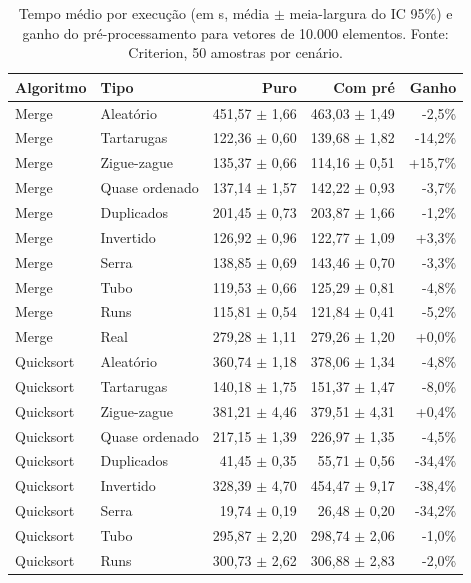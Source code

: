 \begin{table}[ht]
\centering
\caption{Tempo médio por execução (em \textmu{}s, média $\pm$ meia-largura do IC 95\%) e ganho do pré-processamento para vetores de 10.000 elementos. Fonte: Criterion, 50 amostras por cenário.}
\label{tab:tempos}
\small
\begin{tabular}{llrrr}
\hline
\textbf{Algoritmo} & \textbf{Tipo} & \textbf{Puro} & \textbf{Com pré} & \textbf{Ganho} \\
\hline
Merge & Aleatório & 451,57 $\pm$ 1,66 & 463,03 $\pm$ 1,49 & -2,5\% \\
Merge & Tartarugas & 122,36 $\pm$ 0,60 & 139,68 $\pm$ 1,82 & -14,2\% \\
Merge & Zigue-zague & 135,37 $\pm$ 0,66 & 114,16 $\pm$ 0,51 & +15,7\% \\
Merge & Quase ordenado & 137,14 $\pm$ 1,57 & 142,22 $\pm$ 0,93 & -3,7\% \\
Merge & Duplicados & 201,45 $\pm$ 0,73 & 203,87 $\pm$ 1,66 & -1,2\% \\
Merge & Invertido & 126,92 $\pm$ 0,96 & 122,77 $\pm$ 1,09 & +3,3\% \\
Merge & Serra & 138,85 $\pm$ 0,69 & 143,46 $\pm$ 0,70 & -3,3\% \\
Merge & Tubo & 119,53 $\pm$ 0,66 & 125,29 $\pm$ 0,81 & -4,8\% \\
Merge & Runs & 115,81 $\pm$ 0,54 & 121,84 $\pm$ 0,41 & -5,2\% \\
Merge & Real & 279,28 $\pm$ 1,11 & 279,26 $\pm$ 1,20 & +0,0\% \\
Quicksort & Aleatório & 360,74 $\pm$ 1,18 & 378,06 $\pm$ 1,34 & -4,8\% \\
Quicksort & Tartarugas & 140,18 $\pm$ 1,75 & 151,37 $\pm$ 1,47 & -8,0\% \\
Quicksort & Zigue-zague & 381,21 $\pm$ 4,46 & 379,51 $\pm$ 4,31 & +0,4\% \\
Quicksort & Quase ordenado & 217,15 $\pm$ 1,39 & 226,97 $\pm$ 1,35 & -4,5\% \\
Quicksort & Duplicados & 41,45 $\pm$ 0,35 & 55,71 $\pm$ 0,56 & -34,4\% \\
Quicksort & Invertido & 328,39 $\pm$ 4,70 & 454,47 $\pm$ 9,17 & -38,4\% \\
Quicksort & Serra & 19,74 $\pm$ 0,19 & 26,48 $\pm$ 0,20 & -34,2\% \\
Quicksort & Tubo & 295,87 $\pm$ 2,20 & 298,74 $\pm$ 2,06 & -1,0\% \\
Quicksort & Runs & 300,73 $\pm$ 2,62 & 306,88 $\pm$ 2,83 & -2,0\% \\

\end{tabular}
\end{table}
